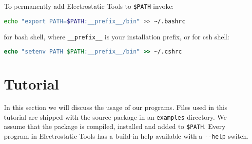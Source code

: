 \documentclass[10pt,a4paper]{article}
\begin{document}
To permanently add Electrostatic Tools to \lstinline{$PATH} invoke:
\begin{lstlisting}[language=bash]
echo "export PATH=$PATH:__prefix__/bin" >> ~/.bashrc
\end{lstlisting}
for bash shell, where \lstinline{__prefix__} is your installation prefix, 
or for csh shell:
\begin{lstlisting}[language=csh]
echo "setenv PATH $PATH:__prefix__/bin" >> ~/.cshrc
\end{lstlisting}

\newpage
\section{Tutorial}
In this section we will discuss the usage of our programs. Files used in this tutorial
are shipped with the source package in an \lstinline{examples} directory. We assume that 
the package is compiled, installed and added to \lstinline{$PATH}. 
Every program in Electrostatic Tools 
has a build-in help available with a \lstinline{--help} switch.
\end{document}
